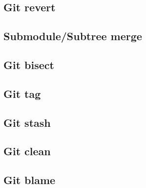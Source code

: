 \documentclass[10pt,a4paper]{beamer}
\begin{document}
\subsection{Git revert}
\begin{frame}

\end{frame}

\subsection{Submodule/Subtree merge}
\begin{frame}

\end{frame}

\subsection{Git bisect}
\begin{frame}

\end{frame}

\subsection{Git tag}
\begin{frame}

\end{frame}

\subsection{Git stash}
\begin{frame}

\end{frame}

\subsection{Git clean}
\begin{frame}

\end{frame}

\subsection{Git blame}
\begin{frame}

\end{frame}
\end{document}
